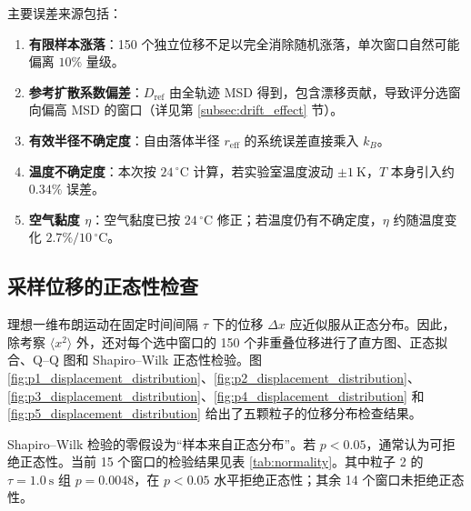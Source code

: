 \documentclass[12pt,a4paper]{ctexart}
\begin{document}
主要误差来源包括：

\begin{enumerate}[leftmargin=2em]
  \item \textbf{有限样本涨落}：150 个独立位移不足以完全消除随机涨落，单次窗口自然可能偏离 $10\%$ 量级。
  \item \textbf{参考扩散系数偏差}：$D_\text{ref}$ 由全轨迹 MSD 得到，包含漂移贡献，导致评分选窗向偏高 MSD 的窗口（详见第 \ref{subsec:drift_effect} 节）。
  \item \textbf{有效半径不确定度}：自由落体半径 $r_\text{eff}$ 的系统误差直接乘入 $k_B$。
  \item \textbf{温度不确定度}：本次按 $24\,^\circ\text{C}$ 计算，若实验室温度波动 $\pm\SI{1}{\kelvin}$，$T$ 本身引入约 $0.34\%$ 误差。
  \item \textbf{空气黏度 $\eta$}：空气黏度已按 $24\,^\circ\text{C}$ 修正；若温度仍有不确定度，$\eta$ 约随温度变化 $2.7\%/10\,^\circ\text{C}$。
\end{enumerate}

\subsection{采样位移的正态性检查}

理想一维布朗运动在固定时间间隔 $\tau$ 下的位移 $\Delta x$ 应近似服从正态分布。因此，除考察 $\langle x^2\rangle$ 外，还对每个选中窗口的 150 个非重叠位移进行了直方图、正态拟合、Q--Q 图和 Shapiro--Wilk 正态性检验。图 \ref{fig:p1_displacement_distribution}、\ref{fig:p2_displacement_distribution}、\ref{fig:p3_displacement_distribution}、\ref{fig:p4_displacement_distribution} 和 \ref{fig:p5_displacement_distribution} 给出了五颗粒子的位移分布检查结果。

Shapiro--Wilk 检验的零假设为“样本来自正态分布”。若 $p<0.05$，通常认为可拒绝正态性。当前 15 个窗口的检验结果见表 \ref{tab:normality}。其中粒子 2 的 $\tau=\SI{1.0}{\second}$ 组 $p=0.0048$，在 $p<0.05$ 水平拒绝正态性；其余 14 个窗口未拒绝正态性。
\end{document}
